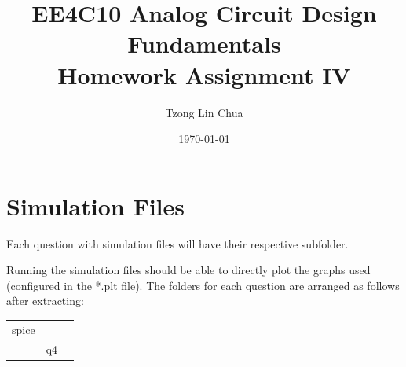 \documentclass{article}
\author{Tzong Lin Chua}
\date{\today}
\title{EE4C10 Analog Circuit Design Fundamentals\\\medskip
\large Homework Assignment IV }
\begin{document}
\maketitle
\tableofcontents


\section{Simulation Files}
\label{sec:org6740144}
Each question with simulation files will have their respective subfolder.

Running the simulation files should be able to directly plot the graphs used (configured in the *.plt file).
The folders for each question are arranged as follows after extracting:

\begin{center}
\begin{tabular}{lll}
\hline
spice &  & \\
 & q4 & \\
\hline
\end{tabular}
\end{center}
\end{document}
